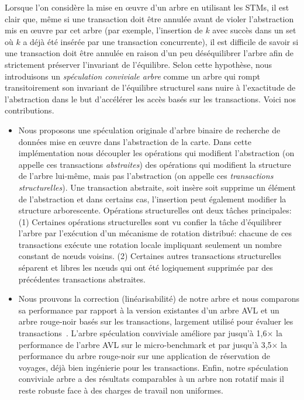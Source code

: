 Lorsque l'on considère la mise en œuvre d'un arbre en utilisant les STMs, il est clair que, même si une transaction doit être annulée avant de violer
l'abstraction mis en œuvre par cet arbre (par exemple, l'insertion de $k$ avec succès dans un set où $k$ a déjà été insérée par une transaction concurrente),
il est difficile de savoir si une transaction doit être annulée en raison d'un peu déséquilibrer l'arbre afin de strictement préserver l'invariant de l'équilibre.
Selon cette hypothèse, nous introduisons un \emph{spéculation conviviale arbre} comme un arbre qui rompt transitoirement son invariant de l'équilibre structurel
sans nuire à l'exactitude de l'abstraction dans le but d'accélérer les accès basés sur les transactions.
Voici nos contributions.


\begin{itemize}

\item Nous proposons une spéculation originale d'arbre binaire de recherche de données mise en œuvre dans l'abstraction de la carte.
Dans cette implémentation nous découpler les opérations qui modifient l'abstraction
(on appelle ces transactions \emph{abstraites}) des opérations qui modifient la structure de l'arbre lui-même, mais pas l'abstraction (on appelle ces \emph{transactions structurelles}).
Une transaction abstraite, soit insère soit supprime un élément de l'abstraction et dans certains cas, l'insertion peut également modifier la structure arborescente.
Opérations structurelles ont deux tâches principales:
(1) Certaines opérations structurelles sont vu confier la tâche d'équilibrer l'arbre par l'exécution d'un mécanisme de rotation distribué:
chacune de ces transactions exécute une rotation locale impliquant seulement un nombre constant de nœuds voisins.
(2) Certaines autres transactions structurelles séparent et libres les nœuds qui ont été logiquement supprimée par des précédentes transactions abstraites.



\item Nous prouvons la correction (linéarisabilité) de notre arbre et nous comparons sa performance par rapport à la version existantes d'un arbre AVL
et un arbre rouge-noir basés sur les transactions, largement utilisé pour évaluer les transactions~\cite{DSS06, HLMS03, CCKO08, HK08 , FFR08, YNW 08, DFGG11}.
L'arbre spéculation conviviale améliore par jusqu'à 1,6$\times$ la performance de l'arbre AVL sur le micro-benchmark et par jusqu'à 3,5$\times$ la performance du arbre rouge-noir sur
une application de réservation de voyages, déjà bien ingénierie pour les transactions.
Enfin, notre spéculation conviviale arbre a des résultats comparables à un arbre non rotatif mais il reste robuste face à des charges de travail non uniformes.




\end{itemize}
